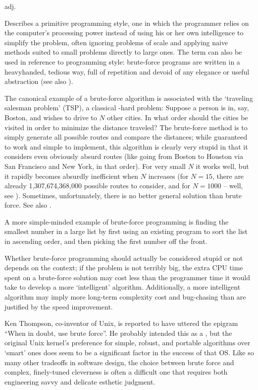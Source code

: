  adj.

Describes a primitive programming style, one in which the programmer relies on
the computer's processing power instead of using his or her own intelligence to
simplify the problem, often ignoring problems of scale and applying naive
methods suited to small problems directly to large ones. The term can also be
used in reference to programming style: brute-force programs are written in a
heavyhanded, tedious way, full of repetition and devoid of any elegance or
useful abstraction (see also ).

The canonical example of a brute-force algorithm is associated with the
`traveling salesman problem' (TSP), a classical -hard problem:
Suppose a person is in, say, Boston, and wishes to drive to $N$ other cities. In
what order should the cities be visited in order to minimize the distance
traveled? The brute-force
method is to simply generate all possible routes and compare the distances;
while guaranteed to work and simple to implement, this algorithm is clearly very
stupid in that it considers even obviously absurd routes (like going from Boston
to Houston via San Francisco and New York, in that order). For very small $N$ it
works well, but it rapidly becomes absurdly inefficient when $N$ increases (for
$N=15$, there are already 1,307,674,368,000 possible routes to consider, and for
$N=1000$ -- well, see ). Sometimes, unfortunately, there is no
better general solution than brute force. See also .

A more simple-minded example of brute-force programming is finding the smallest
number in a large list by first using an existing program to sort the list in
ascending order, and then picking the first number off the front.

Whether brute-force programming should actually be considered stupid or not
depends on the context; if the problem is not terribly big, the extra CPU time
spent on a brute-force solution may cost less than the programmer time it would
take to develop a more `intelligent' algorithm. Additionally, a more intelligent
algorithm may imply more long-term complexity cost and bug-chasing than are
justified by the speed improvement.

Ken Thompson, co-inventor of Unix, is reported to have uttered the epigram
``When in doubt, use brute force''. He probably intended this as a , but the original Unix kernel's preference for simple, robust,
and portable algorithms over  `smart' ones does seem to be a
significant factor in the success of that OS. Like so many other tradeoffs in
software design, the choice between brute force and complex, finely-tuned
cleverness is often a difficult one that requires both engineering savvy and
delicate esthetic judgment.

